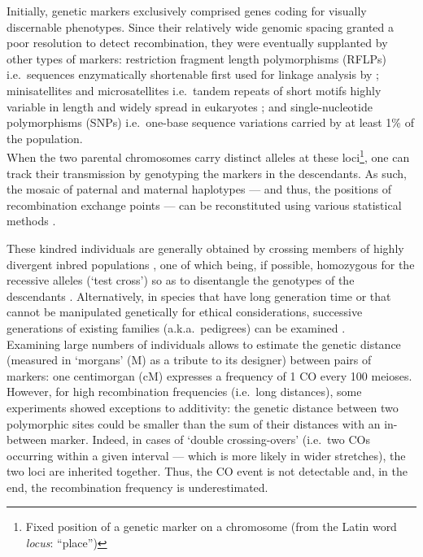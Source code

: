 Initially, genetic markers exclusively comprised genes coding for visually discernable phenotypes.
Since their relatively wide genomic spacing granted a poor resolution to detect recombination, they were eventually supplanted by other types of markers: restriction fragment length polymorphisms (RFLPs) i.e.\ sequences enzymatically shortenable first used for linkage analysis by \citet{botstein1980construction}; minisatellites and microsatellites \citep{hamada1982potential} i.e.\ tandem repeats of short motifs highly variable in length \citep{ellegren2004microsatellites} and widely spread in eukaryotes \citep{hamada1982novel}; and single-nucleotide polymorphisms (SNPs) i.e.\ one-base sequence variations carried by at least 1\% of the population.\\

When the two parental chromosomes carry distinct alleles at these loci\footnote{Fixed position of a genetic marker on a chromosome (from the Latin word \textit{locus}: “place”)}, one can track their transmission by genotyping the markers in the descendants.
As such, the mosaic of paternal and maternal haplotypes — and thus, the positions of recombination exchange points — can be reconstituted using various statistical methods \citep[reviewed in \citealp{backstrom2009gene}]{haldane1919combination, kosambi1943estimation}.

These kindred individuals are generally obtained by crossing members of highly divergent inbred populations \citep[e.g.][]{rowe1994maps,dietrich1996comprehensive}, one of which being, if possible, homozygous for the recessive alleles (‘test cross’) so as to disentangle the genotypes of the descendants \citep[reviewed in][]{brown2002mapping}.
Alternatively, in species that have long generation time or that cannot be manipulated genetically for ethical considerations, successive generations of existing families (a.k.a.\ pedigrees) can be examined \citep[e.g.][]{kong2002highresolution,kong2010finescale,cox2009new}.\\

Examining large numbers of individuals allows to estimate the genetic distance (measured in ‘morgans’ (M) as a tribute to its designer) between pairs of markers: one centimorgan (cM) expresses a frequency of 1 CO every 100 meioses.
However, for high recombination frequencies (i.e.\ long distances), some experiments \citep[e.g.][]{morgan1911random,morgan1912data} showed exceptions to additivity: the genetic distance between two polymorphic sites could be smaller than the sum of their distances with an in-between marker.
Indeed, in cases of ‘double crossing-overs’ (i.e.\ two COs occurring within a given interval — which is more likely in wider stretches), the two loci are inherited together.
Thus, the CO event is not detectable and, in the end, the recombination frequency is underestimated.

